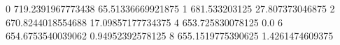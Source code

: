 0 719.2391967773438 65.51336669921875
1 681.533203125 27.807373046875
2 670.8244018554688 17.09857177734375
4 653.725830078125 0.0
6 654.6753540039062 0.94952392578125
8 655.1519775390625 1.4261474609375
